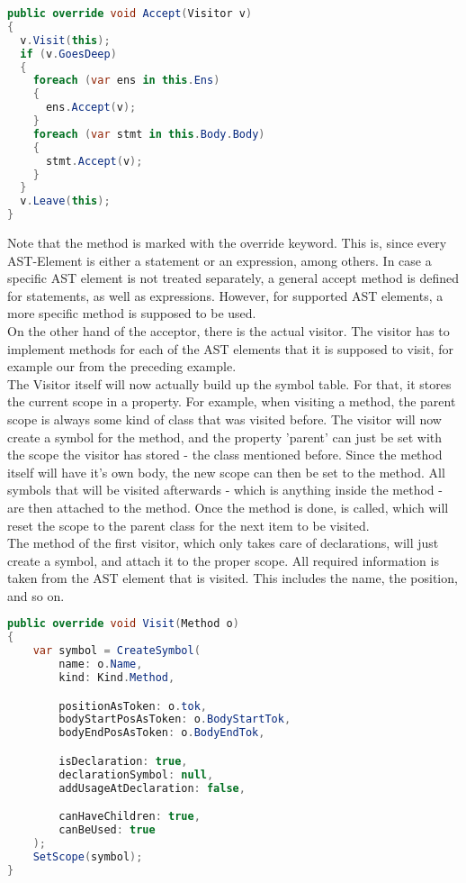 \begin{lstlisting}[language=csharp, caption={Accepting a Visitor}, captionpos=b, label={lst:visitoraccept}]
public override void Accept(Visitor v)
{
  v.Visit(this);
  if (v.GoesDeep)
  {
    foreach (var ens in this.Ens)
    {
      ens.Accept(v);
    }
    foreach (var stmt in this.Body.Body)
    {
      stmt.Accept(v);
    }
  }
  v.Leave(this);
}
\end{lstlisting}

Note that the method is marked with the override keyword.
This is, since every AST-Element is either a statement or an expression, among others.
In case a specific AST element is not treated separately, a general accept method is defined for statements, as well as expressions.
However, for supported AST elements, a more specific method is supposed to be used.\\

On the other hand of the acceptor, there is the actual visitor.
The visitor has to implement  methods for each of the AST elements that it is supposed to visit, for example our  from the preceding example.\\

The Visitor itself will now actually build up the symbol table.
For that, it stores the current scope in a property.
For example, when visiting a method, the parent scope is always some kind of class that was visited before.
The visitor will now create a symbol for the method, and the property 'parent' can just be set with the scope the visitor has stored - the class mentioned before.
Since the method itself will have it's own body, the new scope can then be set to the method.
All symbols that will be visited afterwards - which is anything inside the method - are then attached to the method.
Once the method is done,  is called, which will reset the scope to the parent class for the next item to be visited.\\

The  method of the first visitor, which only takes care of declarations, will just create a symbol, and attach it to the proper scope.
All required information is taken from the AST element that is visited.
This includes the name, the position, and so on.\\

\begin{lstlisting}[language=csharp, caption={Visiting a Method}, captionpos=b, label={lst:visitorvisit1}]
public override void Visit(Method o)
{
    var symbol = CreateSymbol(
        name: o.Name,
        kind: Kind.Method,

        positionAsToken: o.tok,
        bodyStartPosAsToken: o.BodyStartTok,
        bodyEndPosAsToken: o.BodyEndTok,

        isDeclaration: true,
        declarationSymbol: null,
        addUsageAtDeclaration: false,

        canHaveChildren: true,
        canBeUsed: true
    );
    SetScope(symbol);
}
\end{lstlisting}

